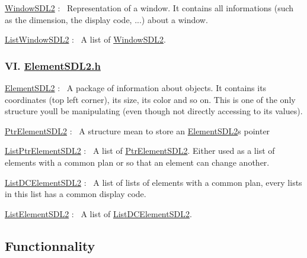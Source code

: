 \begin{DoxyEnumerate}
\item \hyperlink{structWindowSDL2}{Window\+S\+D\+L2} \+:~\newline
 Representation of a window. It contains all informations (such as the dimension, the display code, ...) about a window.
\item \hyperlink{structListWindowSDL2}{List\+Window\+S\+D\+L2} \+:~\newline
 A list of \hyperlink{structWindowSDL2}{Window\+S\+D\+L2}.
\end{DoxyEnumerate}

\subsubsection*{VI. \hyperlink{ElementSDL2_8h}{Element\+S\+D\+L2.\+h}}


\begin{DoxyEnumerate}
\item \hyperlink{structElementSDL2}{Element\+S\+D\+L2} \+:~\newline
 A package of information about objects. It contains its coordinates (top left corner), its size, its color and so on. This is one of the only structure you\textquotesingle{}ll be manipulating (even though not directly accessing to its values).
\item \hyperlink{structPtrElementSDL2}{Ptr\+Element\+S\+D\+L2} \+:~\newline
 A structure mean to store an \hyperlink{structElementSDL2}{Element\+S\+D\+L2}\textquotesingle{}s pointer
\item \hyperlink{structListPtrElementSDL2}{List\+Ptr\+Element\+S\+D\+L2} \+:~\newline
 A list of \hyperlink{structPtrElementSDL2}{Ptr\+Element\+S\+D\+L2}. Either used as a list of elements with a common plan or so that an element can change another.
\item \hyperlink{structListDCElementSDL2}{List\+D\+C\+Element\+S\+D\+L2} \+:~\newline
 A list of lists of elements with a common plan, every lists in this list has a common display code.
\item \hyperlink{structListElementSDL2}{List\+Element\+S\+D\+L2} \+:~\newline
 A list of \hyperlink{structListDCElementSDL2}{List\+D\+C\+Element\+S\+D\+L2}.
\end{DoxyEnumerate}

\subsection*{Functionnality}

